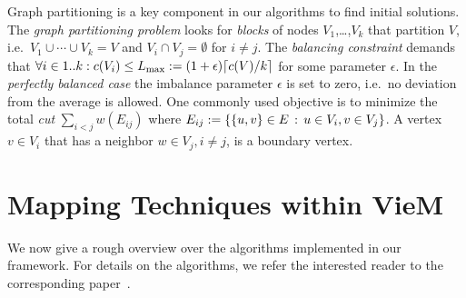 \documentclass[11pt]{article}
\newcommand{\ie}{i.e.\ }
\begin{document}
Graph partitioning is a key component in our algorithms to find initial solutions. 
The \emph{graph partitioning problem} looks for \emph{blocks} of nodes $V_1$,\ldots,$V_k$ 
that partition $V$, \ie $V_1\cup\cdots\cup V_k=V$ and $V_i\cap V_j=\emptyset$
for $i\neq j$. The \emph{balancing constraint} demands that 
$\forall i\in 1..k: c(V_i)\leq L_{\max}:= (1+\epsilon)\lceil c(V)/k \rceil$ for
some parameter $\epsilon$. 
In the \emph{perfectly balanced case} the imbalance parameter $\epsilon $ is set to zero, \ie no deviation from the average is allowed.
One commonly used objective is to minimize the total \emph{cut} $\sum_{i<j}w(E_{ij})$ where 
$E_{ij}:=\left\{ \left\{ u,v\right\}\in E\,:\, u\in V_i,v\in V_j\right\}$. A vertex $v \in V_i$ that has a neighbor $w \in V_j, i\neq j$, is a boundary vertex. 


\vfill
\pagebreak

\section{Mapping Techniques within VieM}
We now give a rough overview over the algorithms implemented in our framework. For details on the algorithms, we refer the interested reader to the corresponding paper~\cite{DBLP:journals/corr/SchulzT17}. \\
\end{document}

